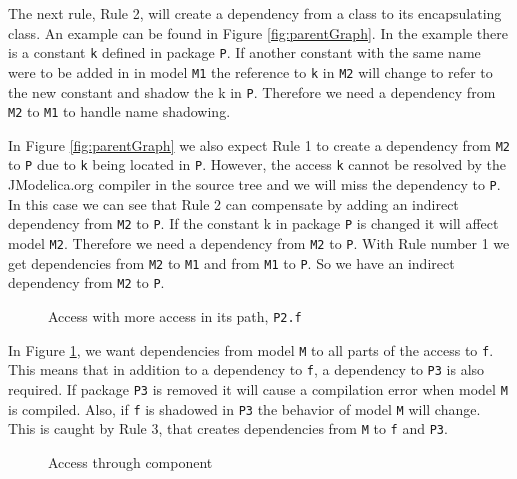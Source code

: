 \documentclass{cslthse-msc}
\begin{document}
The next rule, Rule 2, will create a dependency from a class to its encapsulating class. An example can be found in Figure \ref{fig:parentGraph}. In the example there is a constant \texttt{k} defined in package \texttt{P}. If another constant with the same name were to be added in in model \texttt{M1} the reference to \texttt{k} in \texttt{M2} will change to refer to the new constant and shadow the k in \texttt{P}. Therefore we need a dependency from \texttt{M2} to \texttt{M1} to handle name shadowing.

In Figure \ref{fig:parentGraph} we also expect Rule 1 to create a dependency from \texttt{M2} to \texttt{P} due to \texttt{k} being located in \texttt{P}. However, the access \texttt{k} cannot be resolved by the JModelica.org compiler in the source tree and we will miss the dependency to \texttt{P}. In this case we can see that Rule 2 can compensate by adding an indirect dependency from \texttt{M2} to \texttt{P}. 
If the constant k in package \texttt{P} is changed it will affect model \texttt{M2}. Therefore we need a dependency from \texttt{M2} to \texttt{P}. With Rule number 1 we get dependencies from \texttt{M2} to \texttt{M1} and from \texttt{M1} to \texttt{P}. So we have an indirect dependency from \texttt{M2} to \texttt{P}.

\begin{figure}[!htbp]
    \centering
    \qquad
    \caption{Access with more access in its path, \texttt{P2.f}}
    \label{fig:dotAccess}
\end{figure}

In Figure \ref{fig:dotAccess}, we want dependencies from model \texttt{M} to all parts of the access to \texttt{f}. This means that in addition to a dependency to \texttt{f}, a dependency to \texttt{P3} is also required. If package \texttt{P3} is removed it will cause a compilation error when model \texttt{M} is compiled. Also, if \texttt{f} is shadowed in \texttt{P3} the behavior of model \texttt{M} will change. This is caught by Rule 3, that creates dependencies from \texttt{M} to \texttt{f} and \texttt{P3}.


\begin{figure}[!htbp]
    \centering
    \qquad
    \subfloat{\raisebox{4.7 cm}{}}
    \caption{Access through component}
    \label{fig:component}
\end{figure}
\end{document}
